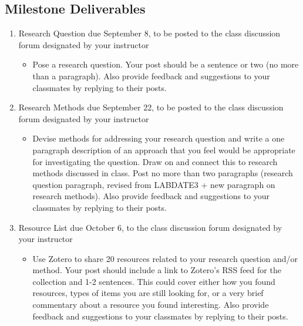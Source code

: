 \documentclass[]{article}
\providecommand{\tightlist}{%
  \setlength{\itemsep}{0pt}\setlength{\parskip}{0pt}}
\begin{document}
\subsection{Milestone Deliverables}\label{milestone-deliverables}

\begin{enumerate}
\def\labelenumi{\arabic{enumi}.}
\tightlist
\item
  Research Question due September 8, to be posted to the class
  discussion forum designated by your instructor

  \begin{itemize}
  \tightlist
  \item
    Pose a research question. Your post should be a sentence or two (no
    more than a paragraph). Also provide feedback and suggestions to
    your classmates by replying to their posts.
  \end{itemize}
\item
  Research Methods due September 22, to be posted to the class
  discussion forum designated by your instructor

  \begin{itemize}
  \tightlist
  \item
    Devise methods for addressing your research question and write a one
    paragraph description of an approach that you feel would be
    appropriate for investigating the question. Draw on and connect this
    to research methods discussed in class. Post no more than two
    paragraphs (research question paragraph, revised from LABDATE3 + new
    paragraph on research methods). Also provide feedback and
    suggestions to your classmates by replying to their posts.
  \end{itemize}
\item
  Resource List due October 6, to the class discussion forum designated
  by your instructor

  \begin{itemize}
  \tightlist
  \item
    Use Zotero to share 20 resources related to your research question
    and/or method. Your post should include a link to Zotero's RSS feed
    for the collection and 1-2 sentences. This could cover either how
    you found resources, types of items you are still looking for, or a
    very brief commentary about a resource you found interesting. Also
    provide feedback and suggestions to your classmates by replying to
    their posts.
  \end{itemize}
\end{enumerate}
\end{document}
